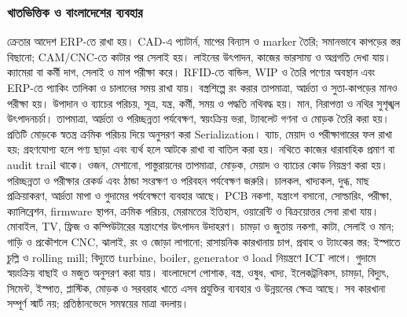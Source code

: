 \subsubsection{খাতভিত্তিক ও বাংলাদেশের ব্যবহার}
ক্রেতার আদেশ ERP-তে রাখা হয়। CAD-এ প্যাটার্ন, মাপের বিন্যাস ও marker তৈরি; সমানভাবে কাপড়ের স্তর বিছানো; CAM/CNC-তে কাটার পর সেলাই হয়। লাইনের উৎপাদন, কাজের ভারসাম্য ও অগ্রগতি দেখা যায়। ক্যামেরা বা কর্মী দাগ, সেলাই ও মাপ পরীক্ষা করে। RFID-তে বান্ডিল, WIP ও তৈরি পণ্যের অবস্থান এবং ERP-তে প্যাকিং তালিকা ও চালানের সময় রাখা যায়। বস্ত্রশিল্পে রং করার তাপমাত্রা, আর্দ্রতা ও সুতা-কাপড়ের মানও পরীক্ষা হয়।
উপাদান ও ব্যাচের পরিচয়, সূত্র, যন্ত্র, কর্মী, সময় ও পদ্ধতি নথিবদ্ধ হয়।  মান, নিরাপত্তা ও নথির সুশৃঙ্খল উৎপাদনচর্চা। তাপমাত্রা, আর্দ্রতা ও পরিচ্ছন্নতা পর্যবেক্ষণ, স্বয়ংক্রিয় ভরা, ট্যাবলেট গণনা ও মোড়ক তৈরি করা হয়। প্রতিটি মোড়কে স্বতন্ত্র ক্রমিক পরিচয় দিয়ে অনুসরণ করা Serialization। ব্যাচ, মেয়াদ ও পরীক্ষাগারের ফল রাখা হয়; গ্রহণযোগ্য হলে পণ্য ছাড়া এবং ব্যর্থ হলে আটকে রাখা বা বাতিল করা হয়। নথিতে কাজের ধারাবাহিক প্রমাণ বা audit trail থাকে।
ওজন, মেশানো, পাস্তুরায়নের তাপমাত্রা, মোড়ক, মেয়াদ ও ব্যাচের কোড নিয়ন্ত্রণ করা হয়। পরিচ্ছন্নতা ও পরীক্ষার রেকর্ড এবং ঠান্ডা সংরক্ষণ ও পরিবহন পর্যবেক্ষণ জরুরি। চালকল, খাদ্যকল, দুগ্ধ, মাছ প্রক্রিয়াকরণ, আর্দ্রতা মাপা ও গুদামের পর্যবেক্ষণে ব্যবহার আছে।
PCB নকশা, যন্ত্রাংশ বসানো, সোল্ডারিং, পরীক্ষা, ক্যালিব্রেশন, firmware স্থাপন, ক্রমিক পরিচয়, মেরামতের ইতিহাস, ওয়ারেন্টি ও বিক্রয়োত্তর সেবা রাখা যায়। মোবাইল, TV, ফ্রিজ ও কম্পিউটারের যন্ত্রাংশের উৎপাদন উদাহরণ। চামড়া ও জুতায় নকশা, কাটা, সেলাই ও মান; গাড়ি ও প্রকৌশলে CNC, ঝালাই, রং ও জোড়া লাগানো; রাসায়নিক কারখানায় চাপ, প্রবাহ ও ট্যাংকের স্তর; ইস্পাতে চুল্লি ও rolling mill; বিদ্যুতে turbine, boiler, generator ও load নিয়ন্ত্রণে ICT লাগে। গুদামে স্বয়ংক্রিয় বাছাই ও মজুত অনুসরণ করা যায়।
বাংলাদেশে পোশাক, বস্ত্র, ওষুধ, খাদ্য, ইলেকট্রনিকস, চামড়া, বিদ্যুৎ, সিমেন্ট, ইস্পাত, প্লাস্টিক, মোড়ক ও সরবরাহ খাতে এসব প্রযুক্তির ব্যবহার ও উন্নয়নের ক্ষেত্র আছে। সব কারখানা সম্পূর্ণ স্মার্ট নয়; প্রতিষ্ঠানভেদে সমন্বয়ের মাত্রা বদলায়।
